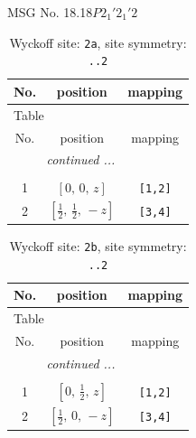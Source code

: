\documentclass[fleqn,8pt]{jsarticle}
\begin{document}
\setcounter{MaxMatrixCols}{32}

\renewcommand{\tablename}{Table~}
\renewcommand{\figurename}{Figure~}
\begin{center}
\LARGE
MSG No. 18.18\quad$P2_{1}'2_{1}'2$
\end{center}
\renewcommand{\arraystretch}{1.2}
\begin{longtable}{ccc}
\caption{Wyckoff site: {\tt 2a}, site symmetry: {\tt ..2}}
 \\
 \hline \hline
No. & position & mapping \\ \hline \endfirsthead

\multicolumn{2}{l}{\tablename\ \thetable{}} \\
 \hline \hline
No. & position & mapping \\ \hline \endhead

 \hline \hline
\multicolumn{2}{r}{\footnotesize\it continued ...} \\ \endfoot

 \hline \hline
\multicolumn{2}{r}{} \\ \endlastfoot

1 & $\left[ 0,\, 0,\, z \right]$ & {\tt [1,2]} \\ \hline
2 & $\left[ \frac{1}{2},\, \frac{1}{2},\, - z \right]$ & {\tt [3,4]} \\
\end{longtable}
\renewcommand{\arraystretch}{1.2}
\begin{longtable}{ccc}
\caption{Wyckoff site: {\tt 2b}, site symmetry: {\tt ..2}}
 \\
 \hline \hline
No. & position & mapping \\ \hline \endfirsthead

\multicolumn{2}{l}{\tablename\ \thetable{}} \\
 \hline \hline
No. & position & mapping \\ \hline \endhead

 \hline \hline
\multicolumn{2}{r}{\footnotesize\it continued ...} \\ \endfoot

 \hline \hline
\multicolumn{2}{r}{} \\ \endlastfoot

1 & $\left[ 0,\, \frac{1}{2},\, z \right]$ & {\tt [1,2]} \\ \hline
2 & $\left[ \frac{1}{2},\, 0,\, - z \right]$ & {\tt [3,4]} \\
\end{longtable}
\renewcommand{\arraystretch}{1.2}
\end{document}
